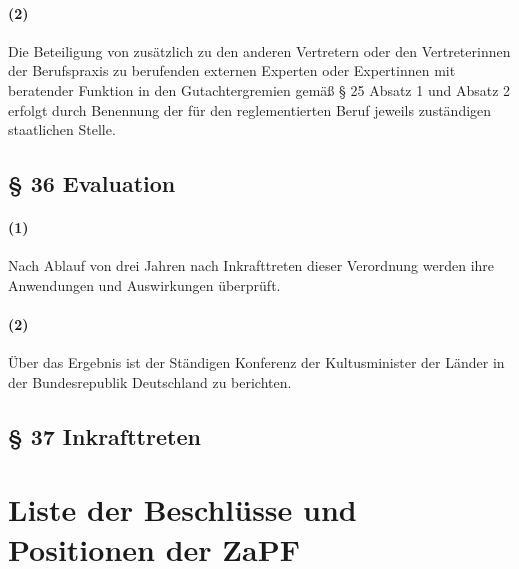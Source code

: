\documentclass[a4paper]{scrartcl}
\begin{document}
\paragraph{(2)} Die Beteiligung von zusätzlich zu den anderen Vertretern oder den Vertreterinnen der Berufspraxis zu berufenden externen Experten oder Expertinnen mit beratender Funktion in den Gutachtergremien gemäß § 25 Absatz 1 und Absatz 2 erfolgt durch Benennung der für den reglementierten Beruf jeweils zuständigen staatlichen Stelle.
\subsection{§ 36 Evaluation}
\paragraph{(1)} Nach Ablauf von drei Jahren nach Inkrafttreten dieser Verordnung werden ihre Anwendungen und Auswirkungen überprüft.
\paragraph{(2)} Über das Ergebnis ist der Ständigen Konferenz der Kultusminister der Länder in der Bundesrepublik Deutschland zu berichten.
\subsection{§ 37 Inkrafttreten}


\pagebreak
\section{Liste der Beschlüsse und Positionen der ZaPF}
\end{document}
